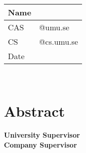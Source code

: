 \begin{titlepage}
	\thispagestyle{empty}
	\noindent {\large \MakeUppercase\university \\
				\instution \\
				\pagetypename \\
			  }

	\begin{center}
	\Large{\textbf{\titleFrontPage}}\\[7pt]

	\Large{\assignmentname}\\[40.0pt]
    
	\begin{tabular}{p{2cm}p{9.5cm}}
		\hline
		Name &  \hfill \name\\\hline
		CAS & \hfill \casuser @umu.se \\\hline
		CS & \hfill \csuser  @cs.umu.se \\\hline
		Date & \hfill \datemade\\ \hline
	\end{tabular}\\
	
	\vspace{10mm}
	\section*{Abstract}\vspace{-10mm}
	
    \vfill
    
	\large{\textbf{University Supervisor\\}\usupervisor}
	\large{\textbf{Company Supervisor\\}\csupervisor}
	\end{center}
	\thispagestyle{empty}
\end{titlepage}
